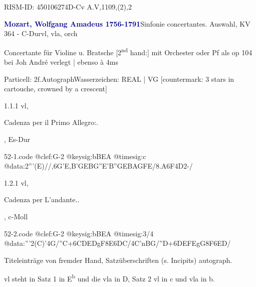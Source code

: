 \documentclass[a4paper, twocolumn, 11pt]{book}
\begin{document}
\par RISM-ID: 450106274\newline D-Cv  A.V,1109,(2),2
\par \vspace{16pt} \textcolor{darkblue}{\textbf{Mozart, Wolfgang Amadeus  1756-1791}}\hfillplus{[52]}\newline Sinfonie concertantes. Auswahl, KV 364 - C-Dur\newline vl, vla, orch
\par \begin{itshape} Concertante für Violine u. Bratsche [2\textsuperscript{n}\textsuperscript{d} hand:] mit Orchester oder Pf als op 104 bei Joh André verlegt | ebenso à 4ms\end{itshape} 
\par \textcolor{darkblue}{}  Particell: 2f.\newline Autograph\newline Wasserzeichen: REAL | VG [countermark: 3 stars in cartouche, crowned by a crescent]
\par 1.1.1  vl, \begin{itshape}Cadenza per il Primo Allegro:.\end{itshape}, Es-Dur  
\begin{filecontents*}{52-1.code}
@clef:G-2
@keysig:bBEA
@timesig:c
@data:2'''(E)//,{6G'E,B'G}{EBG''E}{'B''GEB}{AGFE}/{8.A6F}4D2-/
\end{filecontents*}
\newline %
\par 1.2.1  vl, \begin{itshape}Cadenza per L'andante..\end{itshape}, c-Moll  
\begin{filecontents*}{52-2.code}
@clef:G-2
@keysig:bBEA
@timesig:3/4
@data:'''2(C)'4G/''C+{6CDED}gF{8E6DC}/4C'nBG/''D+{6DEFE}gG{8F6ED}/
\end{filecontents*}
\newline %
\par Titeleinträge von fremder Hand, Satzüberschriften (s. Incipits) autograph.
\par vl steht in Satz 1 in E\textsuperscript{b} und die vla in D, Satz 2 vl in c und vla in b.
\end{document}
